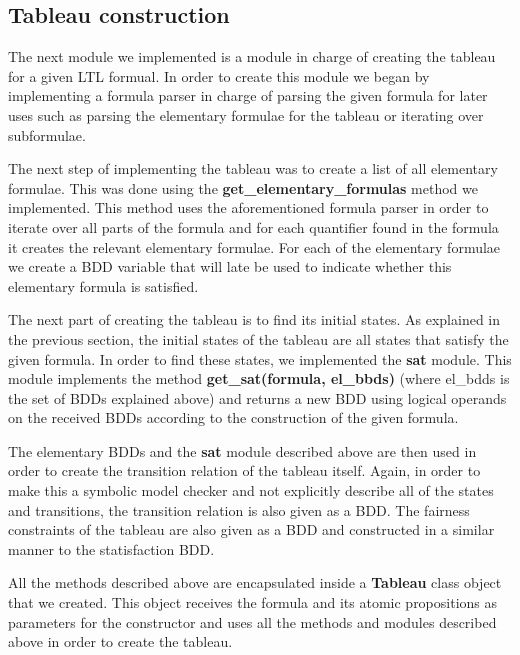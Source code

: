 \documentclass[11pt]{article}
\begin{document}
    \subsection{Tableau construction}
        The next module we implemented is a module in charge of creating the
        tableau for a given LTL formual. In order to create this module we began
        by implementing a formula parser in charge of parsing the given formula 
        for later uses such as parsing the elementary formulae for the tableau or iterating
        over subformulae.

        The next step of implementing the tableau was to create a list of all
        elementary formulae. This was done using the \textbf{get\_elementary\_formulas}
        method we implemented. This method uses the aforementioned formula parser 
        in order to iterate over all parts of the formula and for each quantifier
        found in the formula it creates the relevant elementary formulae.
        For each of the elementary formulae we create a BDD variable that will
        late be used to indicate whether this elementary formula is satisfied.

        The next part of creating the tableau is to find its initial states. As
        explained in the previous section, the initial states of the tableau are
        all states that satisfy the given formula. In order to find these states,
        we implemented the \textbf{sat} module. This module implements the method
        \textbf{get\_sat(formula, el\_bbds)} (where el\_bdds is the set of BDDs
        explained above) and returns a new BDD using logical operands on the
        received BDDs according to the construction of the given formula.

        The elementary BDDs and the \textbf{sat} module described above are then
        used in order to create the transition relation of the tableau itself.
        Again, in order to make this a symbolic model checker and not explicitly
        describe all of the states and transitions, the transition relation is
        also given as a BDD. The fairness constraints of the tableau are also 
        given as a BDD and constructed in a similar manner to the statisfaction
        BDD.

        All the methods described above are encapsulated inside a \textbf{Tableau}
        class object that we created. This object receives the formula and its
        atomic propositions as parameters for the constructor and uses all the
        methods and modules described above in order to create the tableau.
\end{document}

